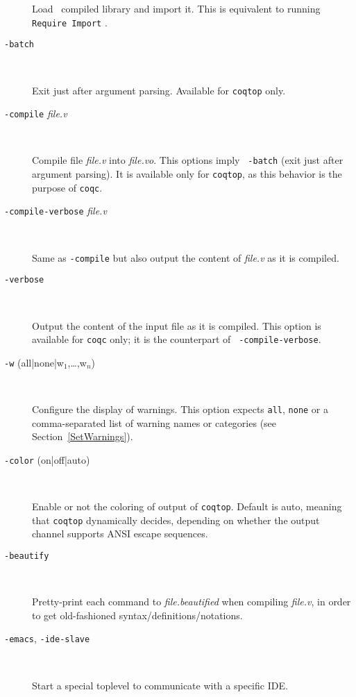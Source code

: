 \begin{description}
  Load \Coq~compiled library {\dirpath} and import it. This is equivalent
  to running {\tt Require Import} {\dirpath}.

\item[{\tt -batch}]\ %

  Exit just after argument parsing. Available for {\tt coqtop} only.

\item[{\tt -compile} {\em file.v}]\ %

  Compile file {\em file.v} into {\em file.vo}. This options imply {\tt
    -batch} (exit just after argument parsing). It is available only
  for {\tt coqtop}, as this behavior is the purpose of {\tt coqc}.

\item[{\tt -compile-verbose} {\em file.v}]\ %

  Same as {\tt -compile} but also output the content of {\em file.v} as
  it is compiled.

\item[{\tt -verbose}]\ %

  Output the content of the input file as it is compiled. This option is
  available for {\tt coqc} only; it is the counterpart of {\tt
    -compile-verbose}.

  \item[{\tt -w} (all|none|w$_1$,\ldots,w$_n$)]\ %

  Configure the display of warnings. This option expects {\tt all}, {\tt none}
  or a comma-separated list of warning names or categories (see
  Section~\ref{SetWarnings}).

%

\item[{\tt -color} (on|off|auto)]\ %

  Enable or not the coloring of output of {\tt coqtop}. Default is auto,
  meaning that {\tt coqtop} dynamically decides, depending on whether the
  output channel supports ANSI escape sequences.

\item[{\tt -beautify}]\ %

  Pretty-print each command to {\em file.beautified} when compiling {\em
    file.v}, in order to get old-fashioned syntax/definitions/notations.

\item[{\tt -emacs}, {\tt -ide-slave}]\ %

  Start a special toplevel to communicate with a specific IDE.


\end{description}
